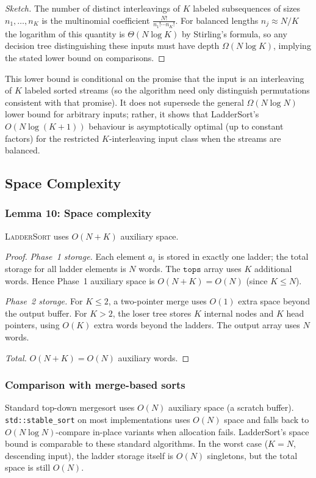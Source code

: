 \documentclass[12pt,a4paper]{article}
\theoremstyle{plain}
\theoremstyle{definition}
\newcommand{\tops}{\texttt{tops}}
\begin{document}
\begin{proof}[Sketch]
The number of distinct interleavings of $K$ labeled subsequences of sizes
$n_1,\dots,n_K$ is the multinomial coefficient
\(\frac{N!}{n_1!\cdots n_K!}\).  For balanced lengths $n_j\approx N/K$ the
logarithm of this quantity is $\Theta(N\log K)$ by Stirling's formula, so
any decision tree distinguishing these inputs must have depth
\(\Omega(N\log K)\), implying the stated lower bound on comparisons.
\end{proof}

This lower bound is conditional on the promise that the input is an
interleaving of $K$ labeled sorted streams (so the algorithm need only
distinguish permutations consistent with that promise).  It does not
supersede the general $\Omega(N\log N)$ lower bound for arbitrary inputs;
rather, it shows that LadderSort's $O(N\log(K+1))$ behaviour is asymptotically
optimal (up to constant factors) for the restricted $K$-interleaving input
class when the streams are balanced.

\subsection{Space Complexity}
\label{sec:space}

\subsubsection{Lemma 10: Space complexity}
\label{lem:space}
\textsc{LadderSort} uses $O(N + K)$ auxiliary space.

\begin{proof}
\emph{Phase~1 storage.}  Each element $a_i$ is stored in exactly one
ladder; the total storage for all ladder elements is $N$ words.  The
$\tops$ array uses $K$ additional words.  Hence Phase~1 auxiliary space
is $O(N + K) = O(N)$ (since $K \le N$).

\emph{Phase~2 storage.}  For $K \le 2$, a two-pointer merge uses $O(1)$
extra space beyond the output buffer.  For $K > 2$, the loser tree
stores $K$ internal nodes and $K$ head pointers, using $O(K)$ extra words
beyond the ladders.  The output array uses $N$ words.

\emph{Total.}  $O(N + K) = O(N)$ auxiliary words.
\end{proof}

\subsubsection{Comparison with merge-based sorts}
Standard top-down mergesort uses $O(N)$ auxiliary space (a scratch buffer).
\texttt{std::stable\_sort} on most implementations uses $O(N)$ space and
falls back to $O(N \log N)$-compare in-place variants when allocation fails.
LadderSort's space bound is comparable to these standard algorithms.
In the worst case ($K = N$, descending input), the ladder storage itself
is $O(N)$ singletons, but the total space is still $O(N)$.
\end{document}
